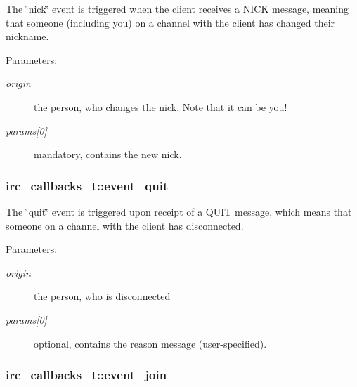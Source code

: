 The \char`\"{}nick\char`\"{} event is triggered when the client receives a NICK message, meaning that someone (including you) on a channel with the client has changed their nickname.

\begin{Desc}
\item[Parameters:]
\begin{description}
\item[{\em origin}]the person, who changes the nick. Note that it can be you! \item[{\em params\mbox{[}0\mbox{]}}]mandatory, contains the new nick. \end{description}
\end{Desc}
\hypertarget{structirc__callbacks__t_a4a728c3926384c3781aa65a18ebeb7a}{
\subsubsection[event\_\-quit]{ {\bf irc\_\-callbacks\_\-t::event\_\-quit}}}
\label{structirc__callbacks__t_a4a728c3926384c3781aa65a18ebeb7a}


The \char`\"{}quit\char`\"{} event is triggered upon receipt of a QUIT message, which means that someone on a channel with the client has disconnected.

\begin{Desc}
\item[Parameters:]
\begin{description}
\item[{\em origin}]the person, who is disconnected \item[{\em params\mbox{[}0\mbox{]}}]optional, contains the reason message (user-specified). \end{description}
\end{Desc}
\hypertarget{structirc__callbacks__t_8f24c0e2b05425c2308a0106dbaaffec}{
\subsubsection[event\_\-join]{ {\bf irc\_\-callbacks\_\-t::event\_\-join}}}
\label{structirc__callbacks__t_8f24c0e2b05425c2308a0106dbaaffec}


